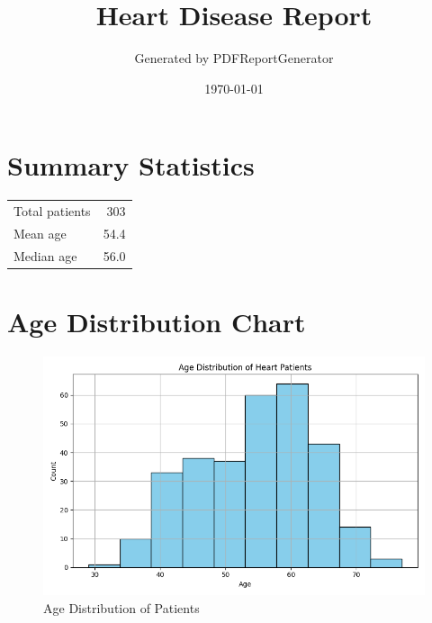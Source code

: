 \documentclass{article}
\begin{document}
\title{Heart Disease Report}
\author{Generated by PDFReportGenerator}
\date{\today}
\maketitle

\section*{Summary Statistics}
\begin{tabular}{lr}
\toprule
Total patients & 303 \\
Mean age & 54.4 \\
Median age & 56.0 \\
\bottomrule
\end{tabular}

\section*{Age Distribution Chart}
\begin{figure}[h!]
    \centering
    \includegraphics[width=0.8\linewidth]{age_distribution.png}
    \caption{Age Distribution of Patients}
\end{figure}
\end{document}
